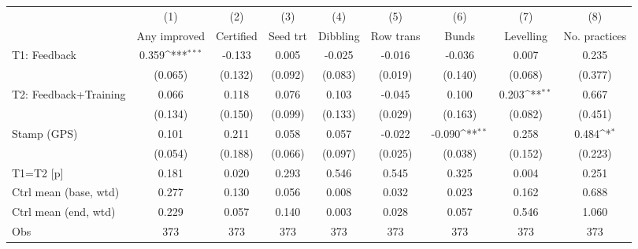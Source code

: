 {
\def\sym#1{\ifmmode^{#1}\else\(^{#1}\)\fi}
\begin{tabular}{l*{8}{c}}
\toprule
                    &\multicolumn{1}{c}{(1)}&\multicolumn{1}{c}{(2)}&\multicolumn{1}{c}{(3)}&\multicolumn{1}{c}{(4)}&\multicolumn{1}{c}{(5)}&\multicolumn{1}{c}{(6)}&\multicolumn{1}{c}{(7)}&\multicolumn{1}{c}{(8)}\\
                    &\multicolumn{1}{c}{Any improved}&\multicolumn{1}{c}{Certified}&\multicolumn{1}{c}{Seed trt}&\multicolumn{1}{c}{Dibbling}&\multicolumn{1}{c}{Row trans}&\multicolumn{1}{c}{Bunds}&\multicolumn{1}{c}{Levelling}&\multicolumn{1}{c}{No. practices}\\
\midrule
T1: Feedback        &       0.359\sym{***}&      -0.133         &       0.005         &      -0.025         &      -0.016         &      -0.036         &       0.007         &       0.235         \\
                    &     (0.065)         &     (0.132)         &     (0.092)         &     (0.083)         &     (0.019)         &     (0.140)         &     (0.068)         &     (0.377)         \\
T2: Feedback+Training&       0.066         &       0.118         &       0.076         &       0.103         &      -0.045         &       0.100         &       0.203\sym{**} &       0.667         \\
                    &     (0.134)         &     (0.150)         &     (0.099)         &     (0.133)         &     (0.029)         &     (0.163)         &     (0.082)         &     (0.451)         \\
Stamp (GPS)         &       0.101         &       0.211         &       0.058         &       0.057         &      -0.022         &      -0.090\sym{**} &       0.258         &       0.484\sym{*}  \\
                    &     (0.054)         &     (0.188)         &     (0.066)         &     (0.097)         &     (0.025)         &     (0.038)         &     (0.152)         &     (0.223)         \\
\midrule
T1=T2 [p]           &       0.181         &       0.020         &       0.293         &       0.546         &       0.545         &       0.325         &       0.004         &       0.251         \\
Ctrl mean (base, wtd)&       0.277         &       0.130         &       0.056         &       0.008         &       0.032         &       0.023         &       0.162         &       0.688         \\
Ctrl mean (end, wtd)&       0.229         &       0.057         &       0.140         &       0.003         &       0.028         &       0.057         &       0.546         &       1.060         \\
Obs                 &         373         &         373         &         373         &         373         &         373         &         373         &         373         &         373         \\
\bottomrule
\end{tabular}
}
